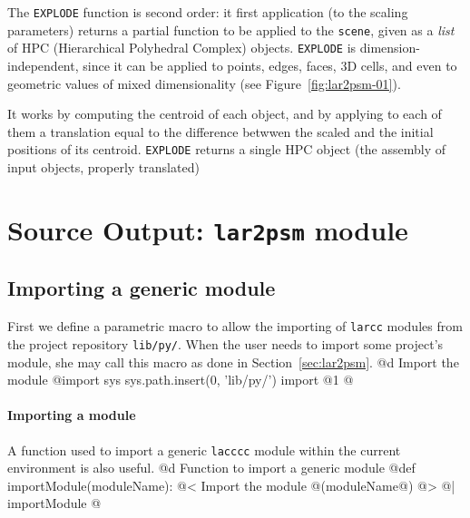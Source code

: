 \documentclass[11pt,oneside]{article}	%
\begin{document}
The \texttt{EXPLODE} function is second order: it first application (to the scaling parameters) returns a partial function to be applied to the \texttt{scene}, given as a \emph{list} of HPC (Hierarchical Polyhedral Complex) objects. 
\texttt{EXPLODE} is dimension-independent, since it can be applied to points, edges, faces, 3D cells, and even to geometric values of mixed dimensionality (see Figure~\ref{fig:lar2psm-01}).

It works by computing the centroid of each object, and by applying to each of them a translation equal to the difference betwwen the scaled and the initial positions of its centroid. 
\texttt{EXPLODE}  returns a single HPC object (the assembly of input objects, properly translated)



\section{Source Output: \texttt{lar2psm} module}


\subsection{Importing a generic module}
First we define a parametric macro to allow the importing of \texttt{larcc} modules from the project repository \texttt{lib/py/}. When the user needs to import some project's module, she may call this macro as done in Section~\ref{sec:lar2psm}.
@d Import the module
@{import sys
sys.path.insert(0, 'lib/py/')
import @1
@}

\paragraph{Importing a module} A function used to import a generic \texttt{lacccc} module within the current environment is also useful.
@d Function to import a generic module
@{def importModule(moduleName):
	@< Import the module @(moduleName@) @>
@| importModule @}
\end{document}
